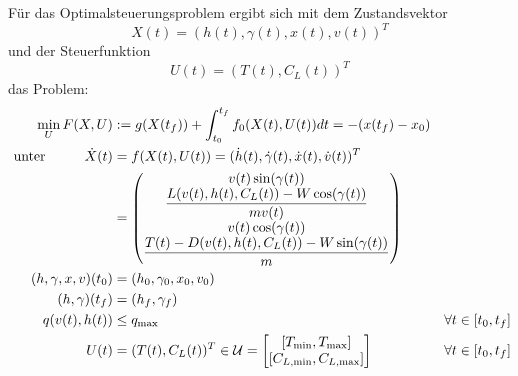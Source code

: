 \begin{problem}\label{prob:MaxRF}
    Für das Optimalsteuerungsproblem ergibt sich mit dem Zustandsvektor
    \[X(t) = (h(t),\gamma(t),x(t),v(t))^T\]
    und der Steuerfunktion
    \[U(t) = (T(t),C_L(t))^T\]
    das Problem:
    \begin{align*}
        \min_{U} F(X,U) &:= g(X(t_f)) + \int_{t_0}^{t_f} f_0(X(t),U(t)) dt = -(x(t_f) - x_0) & & \\\
        \text{unter} \hspace{10mm} \dot{X}(t) &= f(X(t),U(t)) = (\dot{h}(t),\dot{\gamma}(t),\dot{x}(t),\dot{v}(t))^T  & & \\\
        &= 
        \begin{pmatrix}
            v(t) \sin(\gamma(t)) \\ 
            \dfrac{L(v(t),h(t),C_L(t)) - W \cos(\gamma(t))}{mv(t)} \\ 
            v(t) \cos(\gamma(t)) \\ 
            \dfrac{T(t) - D(v(t),h(t),C_L(t)) - W \sin(\gamma(t))}{m}
        \end{pmatrix} & & \\\
        (h,\gamma,x,v)(t_0) &= (h_0,\gamma_0,x_0,v_0) & & \\\
        (h,\gamma)(t_f) &= (h_f,\gamma_f) & & \\\
        q(v(t),h(t)) &\leq q_{\max} & & \forall t \in [t_0,t_f]\\\
        U(t) &= (T(t),C_L(t))^T \in \mathcal{U} = \left[ 
        \begin{matrix}
            [T_{\min},T_{\max}] \\ 
            [C_{L, \min},C_{L, \max}]
        \end{matrix} 
        \right] & & \forall t \in [t_0,t_f]
    \end{align*}
\end{problem}

